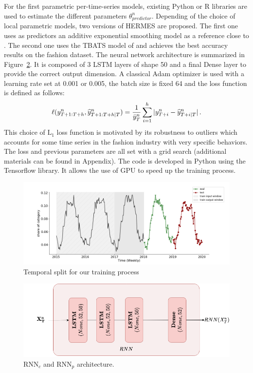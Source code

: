 \documentclass[lettersize,journal]{IEEEtran}
\newcommand{\ts}{y}
\newcommand{\tspred}{\widehat{\ts}}
\newcommand{\statparam}{\theta_{predictor}}
\newcommand{\lag}{h}
\newcommand{\meants}{\Bar{\ts}}
\newcommand{\predictor}{\mathrm{RNN}_p}
\newcommand{\classifier}{\mathrm{RNN}_c}
\begin{document}
For the first parametric per-time-series models, existing Python or R libraries are used to estimate the different parameters $\statparam^n$.  Depending of the choice of local parametric models, two versions of HERMES are proposed. The first one uses as predictors an additive exponential smoothing model as a reference close to \cite{smyl2020hybrid}. The second one uses the TBATS model of \cite{doi:10.1198/jasa.2011.tm09771} and  achieves the best accuracy results on the fashion dataset. The neural network architecture is summarized in Figure~\ref{fig:rnn_architecture}. It is composed of 3 LSTM layers of shape 50 and a final Dense layer to provide the correct output dimension. A classical Adam optimizer is used with a learning rate set at 0.001 or 0.005, the batch size is fixed 64 and the loss function is defined as follows:
$$
\ell(\ts^n_{T+1:T+\lag},\tspred^n_{T+1:T+\lag|T}) = \frac{1}{\meants^n_T}\sum_{i=1}^{\lag}|\ts^n_{T+i} - \tspred^n_{T+i|T}|\,.
$$
This choice of $\mathrm{L}_1$  loss function is motivated by its robustness to outliers which accounts for some time series in the fashion industry with very specific behaviors. The loss and previous parameters are all set with a grid search (additional materials can be found in Appendix). The code is developed in Python using the Tensorflow library. It allows the use of GPU to speed up the training process.



\begin{figure}
  \centering
    \includegraphics[width=1.\linewidth]{figure/train_eval_test_set}
  \caption{Temporal split for our training process}
\label{fig:train_eval_test_set}
\end{figure}

\begin{figure}
  \centering
    \includegraphics[width=0.8\linewidth]{figure/lstm_archi}
  \caption{$\classifier$ and $\predictor$ architecture.}
\label{fig:rnn_architecture}
\end{figure}
\end{document}
